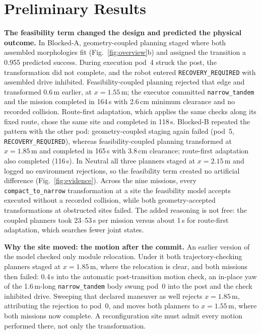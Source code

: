 \documentclass[conference]{IEEEtran}
\begin{document}
\section{Preliminary Results}
\textbf{The feasibility term changed the design and predicted the physical outcome.} In Blocked-A, geometry-coupled planning staged where both assembled morphologies fit (Fig.~\ref{fig:overview}b) and assigned the transition a 0.955 predicted success. During execution pod~4 struck the post, the transformation did not complete, and the robot entered \texttt{RECOVERY\_REQUIRED} with assembled drive inhibited. Feasibility-coupled planning rejected that edge and transformed 0.6\,m earlier, at \(x=1.55\)\,m; the executor committed \texttt{narrow\_tandem} and the mission completed in 164\,s with 2.6\,cm minimum clearance and no recorded collision. Route-first adaptation, which applies the same checks along its fixed route, chose the same site and completed in 118\,s. Blocked-B repeated the pattern with the other pod: geometry-coupled staging again failed (pod~5, \texttt{RECOVERY\_REQUIRED}), whereas feasibility-coupled planning transformed at \(x=1.85\)\,m and completed in 165\,s with 3.8\,cm clearance; route-first adaptation also completed (116\,s). In Neutral all three planners staged at \(x=2.15\)\,m and logged no environment rejections, so the feasibility term created no artificial difference (Fig.~\ref{fig:evidence}). Across the nine missions, every \texttt{compact\_to\_narrow} transformation at a site the feasibility model accepts executed without a recorded collision, while both geometry-accepted transformations at obstructed sites failed. The added reasoning is not free: the coupled planners took 23--53\,s per mission versus about 1\,s for route-first adaptation, which searches fewer joint states.

\textbf{Why the site moved: the motion after the commit.} An earlier version of the model checked only module relocation. Under it both trajectory-checking planners staged at \(x=1.85\)\,m, where the relocation is clear, and both missions then failed: 0.4\,s into the automatic post-transition motion check, an in-place yaw of the 1.6\,m-long \texttt{narrow\_tandem} body swung pod~0 into the post and the check inhibited drive. Sweeping that declared maneuver as well rejects \(x=1.85\)\,m, attributing the rejection to pod~0, and moves both planners to \(x=1.55\)\,m, where both missions now complete. A reconfiguration site must admit every motion performed there, not only the transformation.
\end{document}
